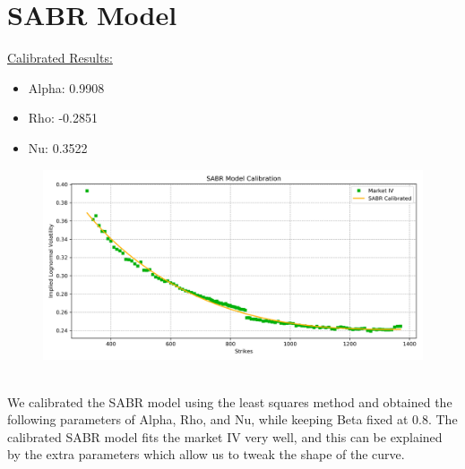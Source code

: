 \documentclass{article}
\begin{document}
\section{SABR Model}
\underline{Calibrated Results:}

\begin{itemize}
	\item Alpha: 0.9908
	\item Rho: -0.2851
	\item Nu: 0.3522
\end{itemize}

\begin{figure}[ht]
	\centering
	\includegraphics[width= \linewidth]{SABR.png}
\end{figure}
\noindent\\
We calibrated the SABR model using the least squares method and obtained the following parameters of Alpha, Rho, and Nu, while keeping Beta fixed at 0.8. The calibrated SABR model fits the market IV very well, and this can be explained by the extra parameters which allow us to tweak the shape of the curve.\\
\end{document}
